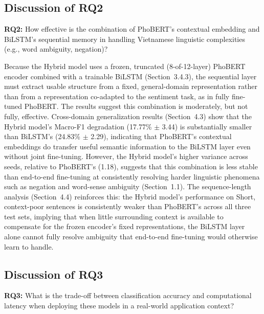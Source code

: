 \documentclass[12pt]{report} %
\begin{document}
\subsection{Discussion of RQ2}
\textbf{RQ2:} How effective is the combination of PhoBERT's contextual embedding and BiLSTM's sequential memory in handling Vietnamese linguistic complexities (e.g., word ambiguity, negation)?

Because the Hybrid model uses a frozen, truncated (8-of-12-layer) PhoBERT encoder combined with a trainable BiLSTM (Section~3.4.3), the sequential layer must extract usable structure from a fixed, general-domain representation rather than from a representation co-adapted to the sentiment task, as in fully fine-tuned PhoBERT. The results suggest this combination is moderately, but not fully, effective. Cross-domain generalization results (Section~4.3) show that the Hybrid model's Macro-F1 degradation (17.77\% $\pm$ 3.44) is substantially smaller than BiLSTM's (24.83\% $\pm$ 2.29), indicating that PhoBERT's contextual embeddings do transfer useful semantic information to the BiLSTM layer even without joint fine-tuning. However, the Hybrid model's higher variance across seeds, relative to PhoBERT's (1.18), suggests that this combination is less stable than end-to-end fine-tuning at consistently resolving harder linguistic phenomena such as negation and word-sense ambiguity (Section~1.1). The sequence-length analysis (Section~4.4) reinforces this: the Hybrid model's performance on Short, context-poor sentences is consistently weaker than PhoBERT's across all three test sets, implying that when little surrounding context is available to compensate for the frozen encoder's fixed representations, the BiLSTM layer alone cannot fully resolve ambiguity that end-to-end fine-tuning would otherwise learn to handle.

\subsection{Discussion of RQ3}
\textbf{RQ3:} What is the trade-off between classification accuracy and computational latency when deploying these models in a real-world application context?
\end{document}
